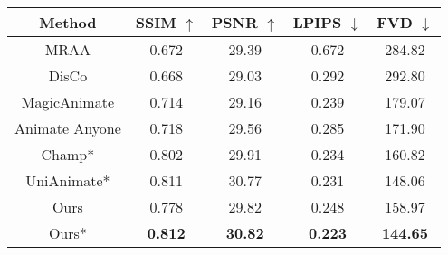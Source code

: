 \begin{tabular}{@{}ccccc@{}}
\toprule
Method         & SSIM $\uparrow$                      & PSNR $\uparrow$                     & LPIPS $\downarrow$                    & FVD  $\downarrow$                      \\ \midrule
MRAA \cite{mraa}          & 0.672           & 29.39        & 0.672           & 284.82                     \\
DisCo \cite{disco}         &  0.668        &     29.03        & 0.292         & 292.80                     \\
MagicAnimate \cite{magicanimate}  & 0.714         & 29.16           & 0.239        & 179.07                     \\
Animate Anyone \cite{aa} & 0.718          & 29.56        & 0.285           & 171.90                      \\
Champ* \cite{champ}         & 0.802          &  29.91         & 0.234         & 160.82 \\
UniAnimate* \cite{unianimate} & 0.811           & 30.77            & 0.231        & 148.06   \\
Ours  & 0.778           & 29.82            & 0.248        & 158.97   \\
Ours*           & \textbf{0.812}            & \textbf{30.82}            & \textbf{0.223}            & \textbf{144.65}            \\ \bottomrule
\end{tabular}